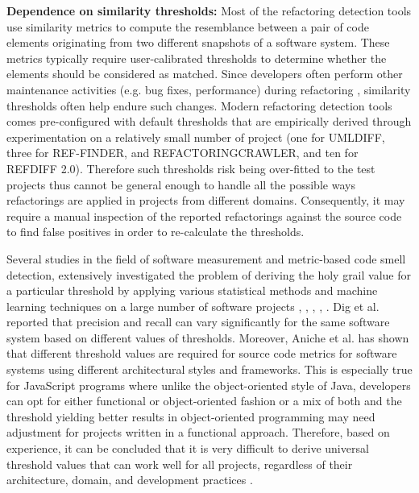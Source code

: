 \documentclass[letterpaper,12pt,onecolumn,final]{report}
\begin{document}
\textbf{Dependence on similarity thresholds:} Most of the refactoring detection tools use similarity metrics to compute the resemblance between a pair of code elements originating from two different snapshots of a software system. These metrics typically require user-calibrated thresholds to determine whether the elements should be considered as matched. Since developers often perform other maintenance activities (e.g. bug fixes, performance) during refactoring \cite{MurphyHill2012}, similarity thresholds often help endure such changes. Modern refactoring detection tools comes pre-configured with default thresholds that are empirically derived through experimentation on a relatively small number of project (one for UMLDIFF, three for REF-FINDER, and REFACTORINGCRAWLER, and ten for REFDIFF 2.0). Therefore such thresholds risk being over-fitted to the test projects thus cannot be general enough to handle all the possible ways refactorings are applied in projects from different domains. Consequently, it may require a manual inspection of the reported refactorings against the source code to find false positives in order to re-calculate the thresholds.

Several studies in the field of software measurement and metric-based code smell detection, extensively investigated the problem of deriving the holy grail value for a particular threshold by applying various statistical methods and machine learning techniques on a large number of software projects \cite{alves2010deriving}, \cite{ferreira2012identifying}, \cite{oliveira2014extracting}, \cite{fontana2015automatic}, \cite{fontana2016comparing}. Dig et al. \cite{dig2006automated} reported that precision and recall can vary significantly for the same software system based on different values of thresholds. Moreover, Aniche et al. \cite{aniche2016satt} has shown that different threshold values are required for source code metrics for software systems using different architectural styles and frameworks. This is especially true for JavaScript programs where unlike the object-oriented style of Java, developers can opt for either functional or object-oriented fashion or a mix of both and the threshold yielding better results in object-oriented programming may need adjustment for projects written in a functional approach. Therefore, based on experience, it can be concluded that it is very difficult to derive universal threshold values that can work well for all projects, regardless of their architecture, domain, and development practices \cite{Tsantalis2020}.
\end{document}
